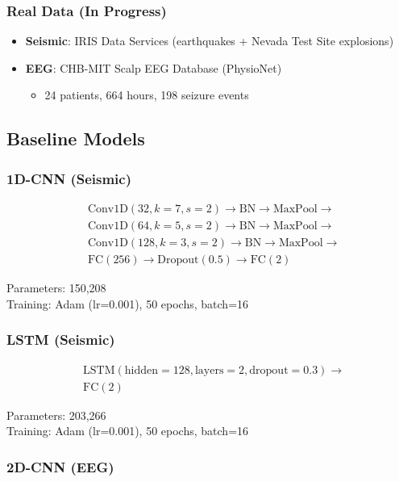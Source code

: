 \documentclass[11pt]{article}
\theoremstyle{remark}
\begin{document}
\subsubsection{Real Data (In Progress)}
\begin{itemize}
\item \textbf{Seismic}: IRIS Data Services (earthquakes + Nevada Test Site explosions)
\item \textbf{EEG}: CHB-MIT Scalp EEG Database (PhysioNet)
\begin{itemize}
\item 24 patients, 664 hours, 198 seizure events
\end{itemize}
\end{itemize}

\subsection{Baseline Models}

\subsubsection{1D-CNN (Seismic)}

\begin{align*}
&\text{Conv1D}(32, k=7, s=2) \to \text{BN} \to \text{MaxPool} \to \\
&\text{Conv1D}(64, k=5, s=2) \to \text{BN} \to \text{MaxPool} \to \\
&\text{Conv1D}(128, k=3, s=2) \to \text{BN} \to \text{MaxPool} \to \\
&\text{FC}(256) \to \text{Dropout}(0.5) \to \text{FC}(2)
\end{align*}

Parameters: 150,208\\
Training: Adam (lr=0.001), 50 epochs, batch=16

\subsubsection{LSTM (Seismic)}

\begin{align*}
&\text{LSTM}(\text{hidden}=128, \text{layers}=2, \text{dropout}=0.3) \to \\
&\text{FC}(2)
\end{align*}

Parameters: 203,266\\
Training: Adam (lr=0.001), 50 epochs, batch=16

\subsubsection{2D-CNN (EEG)}
\end{document}
